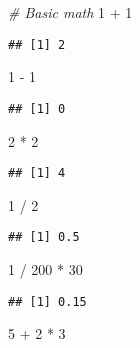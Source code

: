 \documentclass[
]{article}
\newenvironment{Shaded}{\begin{snugshade}}{\end{snugshade}}
\newcommand{\CommentTok}[1]{\textcolor[rgb]{0.56,0.35,0.01}{\textit{#1}}}
\newcommand{\DecValTok}[1]{\textcolor[rgb]{0.00,0.00,0.81}{#1}}
\newcommand{\SpecialCharTok}[1]{\textcolor[rgb]{0.00,0.00,0.00}{#1}}
\begin{document}
\begin{Shaded}
\begin{Highlighting}[]
\CommentTok{\# Basic math}
\DecValTok{1} \SpecialCharTok{+} \DecValTok{1}
\end{Highlighting}
\end{Shaded}

\begin{verbatim}
## [1] 2
\end{verbatim}

\begin{Shaded}
\begin{Highlighting}[]
\DecValTok{1} \SpecialCharTok{{-}} \DecValTok{1}
\end{Highlighting}
\end{Shaded}

\begin{verbatim}
## [1] 0
\end{verbatim}

\begin{Shaded}
\begin{Highlighting}[]
\DecValTok{2} \SpecialCharTok{*} \DecValTok{2}
\end{Highlighting}
\end{Shaded}

\begin{verbatim}
## [1] 4
\end{verbatim}

\begin{Shaded}
\begin{Highlighting}[]
\DecValTok{1} \SpecialCharTok{/} \DecValTok{2}
\end{Highlighting}
\end{Shaded}

\begin{verbatim}
## [1] 0.5
\end{verbatim}

\begin{Shaded}
\begin{Highlighting}[]
\DecValTok{1} \SpecialCharTok{/} \DecValTok{200} \SpecialCharTok{*} \DecValTok{30}
\end{Highlighting}
\end{Shaded}

\begin{verbatim}
## [1] 0.15
\end{verbatim}

\begin{Shaded}
\begin{Highlighting}[]
\DecValTok{5} \SpecialCharTok{+} \DecValTok{2} \SpecialCharTok{*} \DecValTok{3}
\end{Highlighting}
\end{Shaded}
\end{document}
